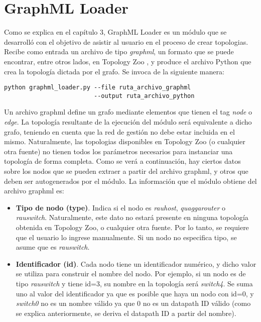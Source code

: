 \section{GraphML Loader}
Como se explica en el capítulo 3, GraphML Loader es un módulo que se desarrolló con el objetivo de asistir al usuario en el proceso de crear topologias. Recibe como entrada un archivo de tipo \textit{graphml}, un formato que se puede encontrar, entre otros lados, en Topology Zoo \cite{topology-zoo}, y produce el archivo Python que crea la topología dictada por el grafo. Se invoca de la siguiente manera:
\begin{lstlisting}
python graphml_loader.py --file ruta_archivo_graphml
                         --output ruta_archivo_python
\end{lstlisting}

Un archivo graphml define un grafo mediante elementos que tienen el tag \textit{node} o \textit{edge}. La topología resultante de la ejecución del módulo será equivalente a dicho grafo, teniendo en cuenta que la red de gestión no debe estar incluida en el mismo. Naturalmente, las topologias disponibles en Topology Zoo (o cualquier otra fuente) no tienen todos los parámetros necesarios para instanciar una topología de forma completa. Como se verá a continuación, hay ciertos datos sobre los nodos que se pueden extraer a partir del archivo graphml, y otros que deben ser autogenerados por el módulo. La información que el módulo obtiene del archivo graphml es:
\begin{itemize}
	\item \textbf{Tipo de nodo (type)}. Indica si el nodo es \textit{rauhost}, \textit{quaggarouter} o \textit{rauswitch}. Naturalmente, este dato no estará presente en ninguna topología obtenida en Topology Zoo, o cualquier otra fuente. Por lo tanto, se requiere que el usuario lo ingrese manualmente. Si un nodo no especifica tipo, se asume que es \textit{rauswitch}.
	\item \textbf{Identificador (id)}. Cada nodo tiene un identificador numérico, y dicho valor se utiliza para construir el nombre del nodo. Por ejemplo, si un nodo es de tipo \textit{rauswitch} y tiene id=3, su nombre en la topología será \textit{switch4}. Se suma uno al valor del identificador ya que es posible que haya un nodo con id=0, y \textit{switch0} no es un nombre válido ya que 0 no es un datapath ID válido (como se explica anteriormente, se deriva el datapath ID a partir del nombre).
\end{itemize}

